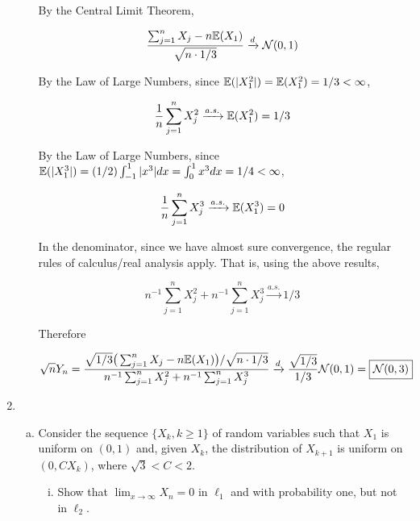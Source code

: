 \begin{enumerate}[(1)]
\begin{enumerate}[(a)]
By the Central Limit Theorem,
 
\[
 \frac{\sum_{j=1}^n X_j - n\mathbb{E}(X_1) }{\sqrt{n \cdot1/3} } \xrightarrow{d} \mathcal{N}(0, 1)
\]

By the Law of Large Numbers, since \(\mathbb{E}(|X_1^2|) = \mathbb{E}(X_1^2) = 1/3 < \infty\),

\[
\frac{1}{n}\sum_{j=1}^n X_j^2 \xrightarrow{a.s.} \mathbb{E}(X_1^2) =   1/3
\]

By the Law of Large Numbers, since \(\mathbb{E}(|X_1^3|) = (1/2) \int_{-1}^1 |x^3| dx = \int_0^1 x^3 dx = 1/4 < \infty\),

\[
\frac{1}{n}\sum_{j=1}^n X_j^3 \xrightarrow{a.s.} \mathbb{E}(X_1^3) =   0
\]

In the denominator, since we have almost sure convergence, the regular rules of calculus/real analysis apply. That is, using the above results,

\[
n^{-1}\sum_{j=1}^n X_j^2 + n^{-1}\sum_{j=1}^n X_j^3 \xrightarrow{a.s.} 1/3
\]

Therefore

\[
\sqrt{n} Y_n =  \frac{\sqrt{1/3} \big(\sum_{j=1}^n X_j - n\mathbb{E}(X_1) \big)/ \sqrt{n \cdot1/3} }{n^{-1}\sum_{j=1}^n X_j^2 + n^{-1}\sum_{j=1}^n X_j^3} \xrightarrow{d} \frac{\sqrt{1/3} }{1/3} \mathcal{N}(0, 1) = \boxed{\mathcal{N}(0, 3)}
\]

\end{enumerate}


\item 



\begin{enumerate}[(a)]

\item Consider the sequence \(\{X_k, k \geq 1\}\) of random variables such that \(X_1\) is uniform on \((0, 1)\) and, given \(X_k\), the distribution of \(X_{k+1}\) is uniform on \((0, CX_k)\), where \(\sqrt{3} < C < 2\).

\begin{enumerate}[(i)]

\item Show that \(\lim_{x \to \infty} X_n = 0\) in \(\ell_1\) and with probability one, but not in \(\ell_2\). 


\end{enumerate}
\end{enumerate}
\end{enumerate}
